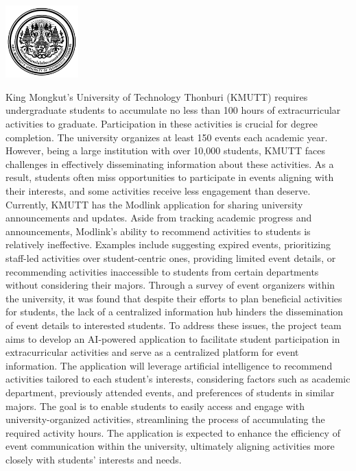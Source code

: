 \documentclass[14pt,oneside,openright,a4paper]{cpe-thai-project}
\begin{document}
\pdfstringdefDisableCommands{%
\let\MakeUppercase\relax
}

\begin{center}
  \includegraphics[width=2.8cm]{./Pictures/logo02.jpg}
\end{center}
\vspace*{-1cm}

\maketitlepage
\makesignaturepage 

\abstract

King Mongkut's University of Technology Thonburi (KMUTT) requires undergraduate students to accumulate no less than 100 hours of extracurricular activities to graduate. Participation in these activities is crucial for degree completion. The university organizes at least 150 events each academic year. However, being a large institution with over 10,000 students, KMUTT faces challenges in effectively disseminating information about these activities. As a result, students often miss opportunities to participate in events aligning with their interests, and some activities receive less engagement than deserve.
Currently, KMUTT has the Modlink application for sharing university announcements and updates. Aside from tracking academic progress and announcements, Modlink's ability to recommend activities to students is relatively ineffective. Examples include suggesting expired events, prioritizing staff-led activities over student-centric ones, providing limited event details, or recommending activities inaccessible to students from certain departments without considering their majors.
Through a survey of event organizers within the university, it was found that despite their efforts to plan beneficial activities for students, the lack of a centralized information hub hinders the dissemination of event details to interested students.
To address these issues, the project team aims to develop an AI-powered application to facilitate student participation in extracurricular activities and serve as a centralized platform for event information. The application will leverage artificial intelligence to recommend activities tailored to each student's interests, considering factors such as academic department, previously attended events, and preferences of students in similar majors.
The goal is to enable students to easily access and engage with university-organized activities, streamlining the process of accumulating the required activity hours. The application is expected to enhance the efficiency of event communication within the university, ultimately aligning activities more closely with students' interests and needs. 
\end{document}
